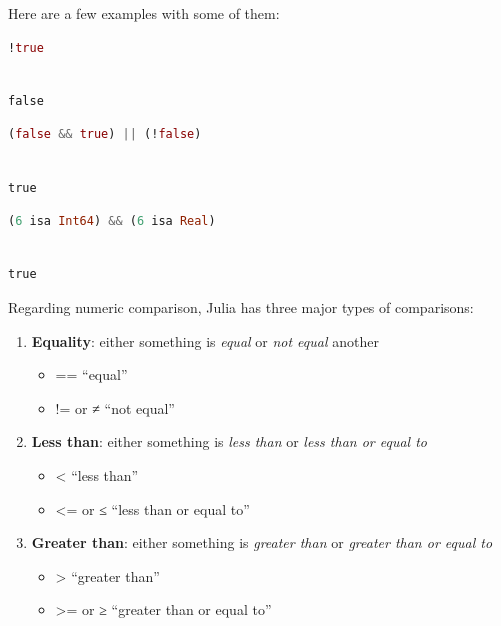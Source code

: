 \documentclass[
  notoc %
]{tufte-book}
\providecommand{\tightlist}{%
  \setlength{\itemsep}{0pt}\setlength{\parskip}{0pt}
}
\begin{document}
Here are a few examples with some of them:

\begin{lstlisting}[language=Julia]
!true
\end{lstlisting}

\begin{lstlisting}[language=Output]

false

\end{lstlisting}

\begin{lstlisting}[language=Julia]
(false && true) || (!false)
\end{lstlisting}

\begin{lstlisting}[language=Output]

true

\end{lstlisting}

\begin{lstlisting}[language=Julia]
(6 isa Int64) && (6 isa Real)
\end{lstlisting}

\begin{lstlisting}[language=Output]

true

\end{lstlisting}

Regarding numeric comparison, Julia has three major types of
comparisons:

\begin{enumerate}
\def\labelenumi{\arabic{enumi}.}
\tightlist
\item
  \textbf{Equality}: either something is \emph{equal} or \emph{not
  equal} another

  \begin{itemize}
  \tightlist
  \item
    == ``equal''
  \item
    != or ≠ ``not equal''
  \end{itemize}
\item
  \textbf{Less than}: either something is \emph{less than} or \emph{less
  than or equal to}

  \begin{itemize}
  \tightlist
  \item
    \textless{} ``less than''
  \item
    \textless= or ≤ ``less than or equal to''
  \end{itemize}
\item
  \textbf{Greater than}: either something is \emph{greater than} or
  \emph{greater than or equal to}

  \begin{itemize}
  \tightlist
  \item
    \textgreater{} ``greater than''
  \item
    \textgreater= or ≥ ``greater than or equal to''
  \end{itemize}
\end{enumerate}
\end{document}
